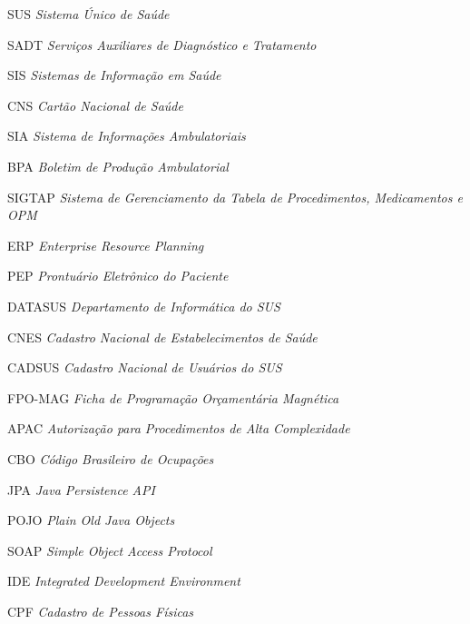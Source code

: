 \documentclass[
12pt,			     	%
a4paper,                %
oneside,                %
brazil		          	%
]{configuracoes}		%
\begin{document}
\begin{siglas}
    \item[SUS] \textit{Sistema Único de Saúde}
    \item[SADT] \textit{Serviços Auxiliares de Diagnóstico e Tratamento}
    \item[SIS] \textit{Sistemas de Informação em Saúde}
    \item[CNS] \textit{Cartão Nacional de Saúde}
    \item[SIA] \textit{Sistema de Informações Ambulatoriais}
    \item[BPA] \textit{Boletim de Produção Ambulatorial}
    \item[SIGTAP] \textit{Sistema de Gerenciamento da Tabela de Procedimentos, Medicamentos e OPM}
    \item[ERP] \textit{Enterprise Resource Planning}
    \item[PEP] \textit{Prontuário Eletrônico do Paciente}
    \item[DATASUS] \textit{Departamento de Informática do SUS}
    \item[CNES] \textit{Cadastro Nacional de Estabelecimentos de Saúde}
    \item[CADSUS] \textit{Cadastro Nacional de Usuários do SUS}
    \item[FPO-MAG] \textit{Ficha de Programação Orçamentária Magnética}
    \item[APAC] \textit{Autorização para Procedimentos de Alta Complexidade}
    \item[CBO] \textit{Código Brasileiro de Ocupações}
    \item[JPA] \textit{Java Persistence API}
    \item[POJO] \textit{Plain Old Java Objects}
    \item[SOAP] \textit{Simple Object Access Protocol}
    \item[IDE] \textit{Integrated Development Environment}
    \item[CPF] \textit{Cadastro de Pessoas Físicas}
\end{siglas}

\end{document}

